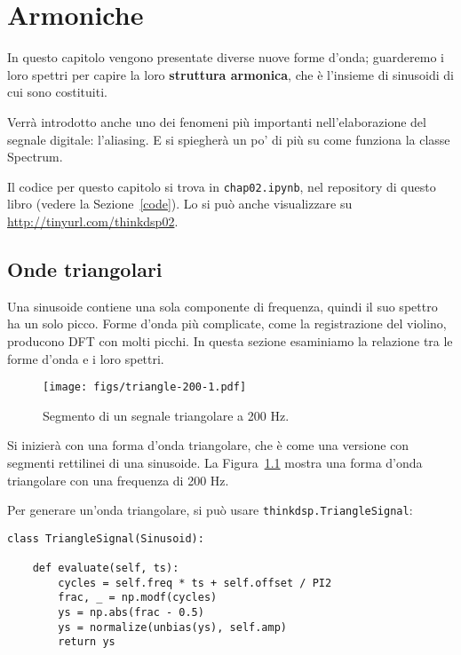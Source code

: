 \documentclass[12pt,a4paper]{book}
\begin{document}
\chapter{Armoniche} \label{harmonics} 

In questo capitolo vengono presentate diverse nuove forme d'onda; guarderemo i loro spettri per capire la loro {\bf struttura armonica}, che è l'insieme di sinusoidi di cui sono costituiti.

Verrà introdotto anche uno dei fenomeni più importanti nell'elaborazione del segnale digitale: l'aliasing. E si spiegherà un po' di più su come funziona la classe Spectrum.

Il codice per questo capitolo si trova in {\tt chap02.ipynb}, nel repository di questo libro (vedere la Sezione~\ref{code}). Lo si può anche visualizzare su \url{http://tinyurl.com/thinkdsp02}.

\section{Onde triangolari} \label{triangle} 

Una sinusoide contiene una sola componente di frequenza, quindi il suo spettro ha un solo picco. Forme d'onda più complicate, come la registrazione del violino, producono DFT con molti picchi. In questa sezione esaminiamo la relazione tra le forme d'onda e i loro spettri.

\begin{figure} 

\centerline{\texttt{[image: figs/triangle-200-1.pdf]}} \caption{Segmento di un segnale triangolare a 200 Hz.} \label{fig.triangle.200.1} \end{figure} 

Si inizierà con una forma d'onda triangolare, che è come una versione con segmenti rettilinei di una sinusoide. La Figura~\ref{fig.triangle.200.1} mostra una forma d'onda triangolare con una frequenza di 200 Hz.

Per generare un'onda triangolare, si può usare {\tt thinkdsp.TriangleSignal}:

\begin{verbatim} 
class TriangleSignal(Sinusoid):

    def evaluate(self, ts):
        cycles = self.freq * ts + self.offset / PI2
        frac, _ = np.modf(cycles)
        ys = np.abs(frac - 0.5)
        ys = normalize(unbias(ys), self.amp)
        return ys
 \end{verbatim} 
\end{document}
